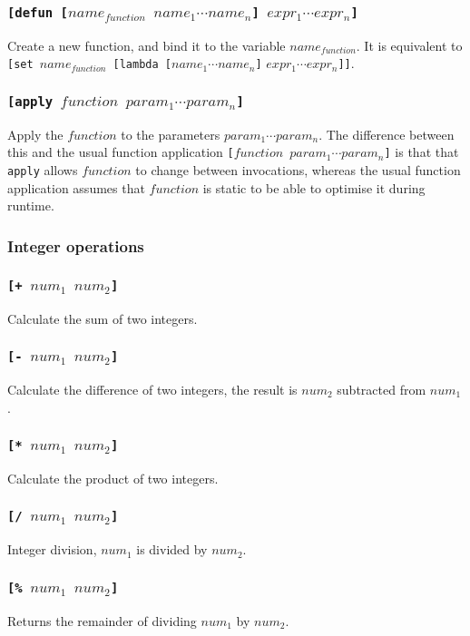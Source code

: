 \documentclass[11pt]{report}
\begin{document}
\subsubsection*{\tt{[defun [}$name_{function}$ $name_1 \cdots name_n$\tt{]} $expr_1 \cdots expr_n$\tt{]}}
Create a new function, and bind it to the variable $name_{function}$. It is equivalent to {\tt{[set }}$name_{function}${\tt{ [lambda [}}$name_1 \cdots name_n${\tt{]}} $expr_1 \cdots expr_n${\tt{]]}}.

\subsubsection*{\tt{[apply }$function$ $param_1 \cdots param_n$\tt{]}}
Apply the $function$ to the parameters $param_1\cdots param_n$. The difference between this and the usual function application {\tt{[}$function$ $param_1\cdots param_n$\tt{]}} is that that \verb|apply| allows $function$ to change between invocations, whereas the usual function application assumes that $function$ is static to be able to optimise it during runtime.

\subsubsection{Integer operations}
\subsubsection*{\tt{[+ }$num_1$ $num_2$\tt{]}}
Calculate the sum of two integers.
\subsubsection*{\tt{[- }$num_1$ $num_2$\tt{]}}
Calculate the difference of two integers, the result is $num_2$ subtracted from $num_1$.
\subsubsection*{\tt{[* }$num_1$ $num_2$\tt{]}}
Calculate the product of two integers.
\subsubsection*{\tt{[/ }$num_1$ $num_2$\tt{]}}
Integer division, $num_1$ is divided by $num_2$.
\subsubsection*{\tt{[\% }$num_1$ $num_2$\tt{]}}
Returns the remainder of dividing $num_1$ by $num_2$.
\end{document}
